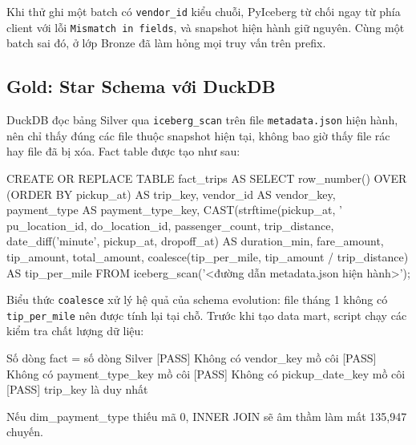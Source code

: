 \documentclass[12pt]{article}
\begin{document}
Khi thử ghi một batch có \texttt{vendor\_id} kiểu chuỗi, PyIceberg từ chối ngay từ phía client với lỗi \texttt{Mismatch in fields}, và snapshot hiện hành giữ nguyên. Cùng một batch sai đó, ở lớp Bronze đã làm hỏng mọi truy vấn trên prefix.

\subsection{Gold: Star Schema với DuckDB}

DuckDB đọc bảng Silver qua \texttt{iceberg\_scan} trên file \texttt{metadata.json} hiện hành, nên chỉ thấy đúng các file thuộc snapshot hiện tại, không bao giờ thấy file rác hay file đã bị xóa. Fact table được tạo như sau:

\begin{aivncodebox}
\begin{python}[language=SQL]
CREATE OR REPLACE TABLE fact_trips AS
SELECT
    row_number() OVER (ORDER BY pickup_at)          AS trip_key,
    vendor_id                                       AS vendor_key,
    payment_type                                    AS payment_type_key,
    CAST(strftime(pickup_at, '%
    pu_location_id, do_location_id, passenger_count, trip_distance,
    date_diff('minute', pickup_at, dropoff_at)      AS duration_min,
    fare_amount, tip_amount, total_amount,
    coalesce(tip_per_mile, tip_amount / trip_distance) AS tip_per_mile
FROM iceberg_scan('<đường dẫn metadata.json hiện hành>');
\end{python}
\end{aivncodebox}

Biểu thức \texttt{coalesce} xử lý hệ quả của schema evolution: file tháng 1 không có \texttt{tip\_per\_mile} nên được tính lại tại chỗ. Trước khi tạo data mart, script chạy các kiểm tra chất lượng dữ liệu:

\begin{aivnCodeOutput}
\begin{python}
  [PASS] Số dòng fact = số dòng Silver
  [PASS] Không có vendor_key mồ côi
  [PASS] Không có payment_type_key mồ côi
  [PASS] Không có pickup_date_key mồ côi
  [PASS] trip_key là duy nhất

Nếu dim_payment_type thiếu mã 0, INNER JOIN sẽ âm thầm làm mất 135,947 chuyến.
\end{python}
\end{aivnCodeOutput}
\end{document}
